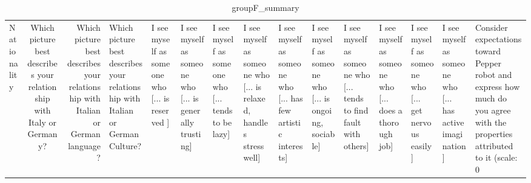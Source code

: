 \begin{table}
\caption{groupF_summary}
\label{tab:groupF_summary}
\begin{tabular}{lcr}
\toprule
Nationality & Which picture best describes your relationship with Italy or Germany? & Which picture best describes your relationship with Italian or German language? & Which picture best describes your relationship with Italian or German Culture? & I see myself as someone who  [... is reserved ] & I see myself as someone who  [... is generally trusting] & I see myself as someone who  [... tends to be lazy] & I see myself as someone who  [... is relaxed, handles stress well] & I see myself as someone who  [... has few artistic interests] & I see myself as someone who  [... is ongoing, sociable] & I see myself as someone who  [... tends to find fault with others] & I see myself as someone who  [... does a thorough job] & I see myself as someone who  [... get nervous easily] & I see myself as someone who  [... has active imagination] & Consider expectations toward Pepper robot and express how much do you agree with the properties attributed to it (scale: 0%
\end{tabular}
\end{table}
